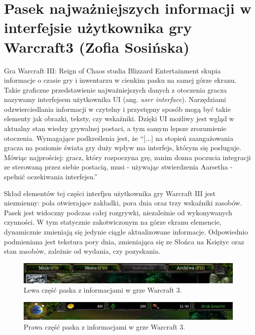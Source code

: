 \section{Pasek najważniejszych informacji w interfejsie użytkownika gry Warcraft3 (Zofia Sosińska)}\label{c:pasek_war3}
Gra Warcraft III: Reign of Chaos studia Blizzard Entertainment skupia informacje o czasie gry i inwentarzu w cienkim pasku na samej górze ekranu. 
Takie graficzne przedstawienie najważniejszych danych z otoczenia gracza nazywamy interfejsem użytkownika UI (ang. \textit{user interface}). Narzędziami odzwierciedlania informacji
w czytelny i przystępny sposób mogą być takie elementy jak obrazki, teksty, czy wskaźniki. Dzięki UI możliwy jest wgląd w aktualny stan wiedzy grywalnej postaci, a tym samym lepsze
 zrozumienie otoczenia. Wymagające podkreślenia jest, że “[...] na stopień zaangażowania gracza na poziomie świata gry duży wpływ ma interfejs, którym się posługuje. Mówiąc najprościej:
gracz, który rozpoczyna grę, zanim dozna poczucia integracji ze sterowaną przez siebie postacią, musi - używając stwierdzenia Aarsetha - spełnić oczekiwania interfejsu.”\cite{olbrzymwcieniu}

Skład elementów tej części interfjsu użytkownika gry Warcraft III jest niezmienny: pola otwierające zakładki, pora dnia oraz trzy wskaźniki zasobów. Pasek jest widoczny
podczas całej rozgrywki, niezależnie od wykonywanych czynności. W tym statycznie zakotwiczonym na górze ekranu elemencie, dynamicznie
zmieniają się jedynie ciągle aktualizowane informacje. Odpowiednio podmieniana jest tekstura pory dnia, zmieniająca się ze Słońca
na Księżyc oraz stan zasobów, zależnie od wydania, czy pozyskania.


\begin{figure}[htbp]
    \centering
    \includegraphics[width=1.0\textwidth]{images/ui/warcraft3_gorny_pasek_lewy.png}
    \caption{Lewa część paska z informacjami w grze Warcraft 3.}\label{fig:Warcraft3}
\end{figure}

\begin{figure}[htbp]
    \centering
    \includegraphics[width=1.0\textwidth]{images/ui/warcraft3_gorny_pasek_prawy.png}
    \caption{Prawa część paska z informacjami w grze Warcraft 3.}\label{fig:Warcraft3}
\end{figure}